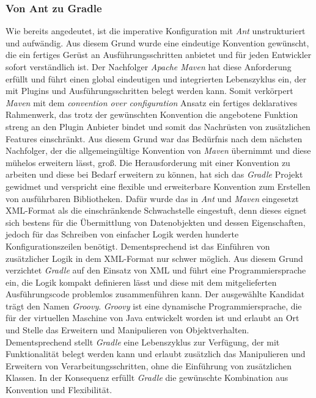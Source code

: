 		\subsubsection{Von Ant zu Gradle}%
		Wie bereits angedeutet, ist die imperative Konfiguration mit \textit{Ant} unstrukturiert und aufwändig. Aus diesem Grund wurde eine eindeutige Konvention gewünscht, die ein fertiges Gerüst an Ausführungsschritten anbietet und für jeden Entwickler sofort verständlich ist. Der Nachfolger \textit{Apache Maven} hat diese Anforderung erfüllt und führt einen global eindeutigen und integrierten Lebenszyklus ein, der mit Plugins und Ausführungsschritten belegt werden kann. Somit verkörpert \textit{Maven} mit dem \textit{convention over configuration} Ansatz ein fertiges deklaratives Rahmenwerk, das trotz der gewünschten Konvention die angebotene Funktion streng an den Plugin Anbieter bindet und somit das Nachrüsten von zusätzlichen Features einschränkt. Aus diesem Grund war das Bedürfnis nach dem nächsten Nachfolger, der die allgemeingültige Konvention von \textit{Maven} übernimmt und diese mühelos erweitern lässt, groß.\bigbreak
		Die Herausforderung mit einer Konvention zu arbeiten und diese bei Bedarf erweitern zu können, hat sich das \textit{Gradle} Projekt gewidmet und verspricht eine flexible und erweiterbare Konvention zum Erstellen von ausführbaren Bibliotheken.\newline
		Dafür wurde das in \textit{Ant} und \textit{Maven} eingesetzt XML-Format als die einschränkende Schwachstelle eingestuft, denn dieses eignet sich bestens für die Übermittlung von Datenobjekten und dessen Eigenschaften, jedoch für das Schreiben von einfacher Logik werden hunderte Konfigurationszeilen benötigt. Dementsprechend ist das Einführen von zusätzlicher Logik in dem XML-Format nur schwer möglich. Aus diesem Grund verzichtet \textit{Gradle} auf den Einsatz von XML und führt eine Programmiersprache ein, die Logik kompakt definieren lässt und diese mit dem mitgelieferten Ausführungscode problemlos zusammenführen kann. \newline
		Der ausgewählte Kandidat trägt den Namen \textit{Groovy}. \textit{Groovy} ist eine dynamische Programmiersprache, die für der virtuellen Maschine von Java entwickelt worden ist und erlaubt an Ort und Stelle das Erweitern und Manipulieren von Objektverhalten.\newline
		Dementsprechend stellt \textit{Gradle} eine Lebenszyklus zur Verfügung, der mit Funktionalität belegt werden kann und erlaubt zusätzlich das Manipulieren und Erweitern von Verarbeitungsschritten, ohne die Einführung von zusätzlichen Klassen. In der Konsequenz erfüllt \textit{Gradle} die gewünschte Kombination aus Konvention und Flexibilität.
		

